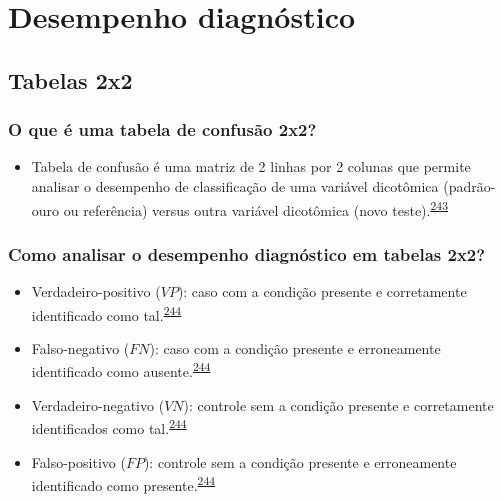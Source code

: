 \documentclass[
  a4paper,
]{book}
\providecommand{\tightlist}{%
  \setlength{\itemsep}{0pt}\setlength{\parskip}{0pt}}
\begin{document}
\hypertarget{analise-desempenho-diagnostico}{%
\chapter{\texorpdfstring{\textbf{Desempenho diagnóstico}}{Desempenho diagnóstico}}\label{analise-desempenho-diagnostico}}

\hypertarget{tabelas-2x2}{%
\section{Tabelas 2x2}\label{tabelas-2x2}}

\hypertarget{o-que-uxe9-uma-tabela-de-confusuxe3o-2x2}{%
\subsection{O que é uma tabela de confusão 2x2?}\label{o-que-uxe9-uma-tabela-de-confusuxe3o-2x2}}

\begin{itemize}
\tightlist
\item
  Tabela de confusão é uma matriz de 2 linhas por 2 colunas que permite analisar o desempenho de classificação de uma variável dicotômica (padrão-ouro ou referência) versus outra variável dicotômica (novo teste).\textsuperscript{\protect\hyperlink{ref-steckelberg2004}{243}}
\end{itemize}

\hypertarget{como-analisar-o-desempenho-diagnuxf3stico-em-tabelas-2x2}{%
\subsection{Como analisar o desempenho diagnóstico em tabelas 2x2?}\label{como-analisar-o-desempenho-diagnuxf3stico-em-tabelas-2x2}}

\begin{itemize}
\item
  Verdadeiro-positivo (\(VP\)): caso com a condição presente e corretamente identificado como tal.\textsuperscript{\protect\hyperlink{ref-greenhalgh1997b}{244}}
\item
  Falso-negativo (\(FN\)): caso com a condição presente e erroneamente identificado como ausente.\textsuperscript{\protect\hyperlink{ref-greenhalgh1997b}{244}}
\item
  Verdadeiro-negativo (\(VN\)): controle sem a condição presente e corretamente identificados como tal.\textsuperscript{\protect\hyperlink{ref-greenhalgh1997b}{244}}
\item
  Falso-positivo (\(FP\)): controle sem a condição presente e erroneamente identificado como presente.\textsuperscript{\protect\hyperlink{ref-greenhalgh1997b}{244}}
\end{itemize}
\end{document}
